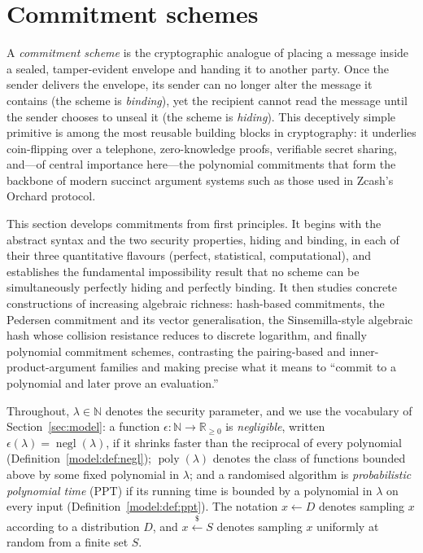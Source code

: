 \documentclass[11pt,a4paper]{article}
\theoremstyle{definition}
\theoremstyle{remark}
\newcommand{\N}{\ensuremath{\mathbb{N}}}
\newcommand{\R}{\ensuremath{\mathbb{R}}}
\DeclareMathOperator{\negl}{negl}
\DeclareMathOperator{\poly}{poly}
\begin{document}
\section{Commitment schemes}\label{sec:commitments}

A \emph{commitment scheme} is the cryptographic analogue of placing a message inside a sealed, tamper-evident envelope and handing it to another party. Once the sender delivers the envelope, its sender can no longer alter the message it contains (the scheme is \emph{binding}), yet the recipient cannot read the message until the sender chooses to unseal it (the scheme is \emph{hiding}). This deceptively simple primitive is among the most reusable building blocks in cryptography: it underlies coin-flipping over a telephone, zero-knowledge proofs, verifiable secret sharing, and---of central importance here---the polynomial commitments that form the backbone of modern succinct argument systems such as those used in Zcash's Orchard protocol.

This section develops commitments from first principles. It begins with the abstract syntax and the two security properties, hiding and binding, in each of their three quantitative flavours (perfect, statistical, computational), and establishes the fundamental impossibility result that no scheme can be simultaneously perfectly hiding and perfectly binding. It then studies concrete constructions of increasing algebraic richness: hash-based commitments, the Pedersen commitment and its vector generalisation, the Sinsemilla-style algebraic hash whose collision resistance reduces to discrete logarithm, and finally polynomial commitment schemes, contrasting the pairing-based and inner-product-argument families and making precise what it means to ``commit to a polynomial and later prove an evaluation.''

Throughout, \(\lambda \in \N\) denotes the security parameter, and we use the vocabulary of Section~\ref{sec:model}: a function \(\epsilon \colon \N \to \R_{\ge 0}\) is \emph{negligible}, written \(\epsilon(\lambda) = \negl(\lambda)\), if it shrinks faster than the reciprocal of every polynomial (Definition~\ref{model:def:negl}); \(\poly(\lambda)\) denotes the class of functions bounded above by some fixed polynomial in \(\lambda\); and a randomised algorithm is \emph{probabilistic polynomial time} (PPT) if its running time is bounded by a polynomial in \(\lambda\) on every input (Definition~\ref{model:def:ppt}). The notation \(x \gets D\) denotes sampling \(x\) according to a distribution \(D\), and \(x \xleftarrow{\$} S\) denotes sampling \(x\) uniformly at random from a finite set \(S\).
\end{document}

